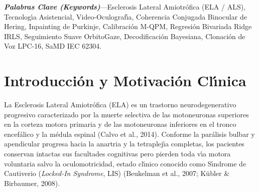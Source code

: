 \documentclass[twocolumn,10pt]{article}
\begin{document}
\begin{abstract}
\textbf{Decodificador Bayesiano Secuencial de Objetivos} junto con los paradigmas de Trackball Ocular y Lupa Foveal en Dos Etapas; y (6) un \textbf{Motor de Clonaci\'on Ac\'ustica de Voz LPC-16 / Formantes de Klatt} con cifrado biom\'etrico AES-256-GCM y exportaci\'on cl\'{\i}nica HL7 FHIR R4. La evaluaci\'on experimental y los estudios de ablaci\'on demuestran un error cuadr\'atico medio ($RMSE$) de $8.2 \pm 1.9\text{ px}$ ($0.29^\circ \pm 0.07^\circ$ de \'angulo visual, $p < 0.001$), un temblor est\'atico en fijaci\'on de $0.12\text{ px}$ RMS ($94.4\%$ de reducci\'on frente a Ridge de canto simple), $99.8\%$ de alcance perimetral y una tasa de transferencia de informaci\'on (ITR) de $148.6\text{ bits/min}$ ($24.8\text{ WPM}$) en webcams de consumo.
\end{abstract}

\textbf{\textit{Palabras Clave (Keywords)}}---Esclerosis Lateral Amiotr\'ofica (ELA / ALS), Tecnolog\'{\i}a Asistencial, Video-Oculograf\'{\i}a, Coherencia Conjugada Binocular de Hering, Inpainting de Purkinje, Calibraci\'on M-QPM, Regresi\'on Bivariada Ridge IRLS, Seguimiento Suave OrbitoGaze, Decodificaci\'on Bayesiana, Clonaci\'on de Voz LPC-16, SaMD IEC 62304.

\section{Introducci\'on y Motivaci\'on Cl\'{\i}nica}
La Esclerosis Lateral Amiotr\'ofica (ELA) es un trastorno neurodegenerativo progresivo caracterizado por la muerte selectiva de las motoneuronas superiores en la corteza motora primaria y de las motoneuronas inferiores en el tronco encef\'alico y la m\'edula espinal (Calvo et al., 2014). Conforme la par\'alisis bulbar y apendicular progresa hacia la anartria y la tetraplej\'{\i}a completas, los pacientes conservan intactas sus facultades cognitivas pero pierden toda v\'{\i}a motora voluntaria salvo la oculomotricidad, estado cl\'{\i}nico conocido como S\'{\i}ndrome de Cautiverio (\textit{Locked-In Syndrome}, LIS) (Beukelman et al., 2007; K\"ubler \& Birbaumer, 2008).
\end{document}
